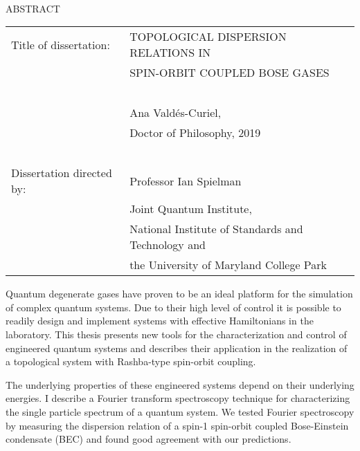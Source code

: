 
\hbox{\ }

\renewcommand{\baselinestretch}{1}
\small \normalsize

\begin{center}
\large{{ABSTRACT}} 

\vspace{3em} 

\end{center}
\hspace{-.15in}
\begin{tabular}{ll}
Title of dissertation:   
&				      {\large  TOPOLOGICAL DISPERSION RELATIONS IN } \\
&				      {\large  SPIN-ORBIT COUPLED BOSE GASES} \\
\ \\
&                     {\large  Ana Valdés-Curiel,} \\
&					  {\large  Doctor of Philosophy, 2019} \\
\ \\
Dissertation directed by: & {\large  Professor Ian Spielman} \\
&  							{\small	 Joint Quantum Institute,} \\
&  							{\small	 National Institute of Standards and Technology and} \\
&  							{\small	 the University of Maryland College Park} \\
\end{tabular}

\vspace{3em}

\renewcommand{\baselinestretch}{2}
\large \normalsize

Quantum degenerate gases have proven to be an ideal platform for the simulation of complex quantum systems. Due to their high level of control it is possible to readily design and implement systems with effective Hamiltonians in the laboratory. This thesis presents new tools for the characterization and control of engineered quantum systems and describes their application in the realization of a topological system with Rashba-type spin-orbit coupling. 

The underlying properties of these engineered systems depend on their underlying energies. I describe a Fourier transform spectroscopy technique for characterizing the single particle spectrum of a quantum system. We tested Fourier spectroscopy by measuring the dispersion relation of a spin-1 spin-orbit coupled Bose-Einstein condensate (BEC) and found good agreement with our predictions.

